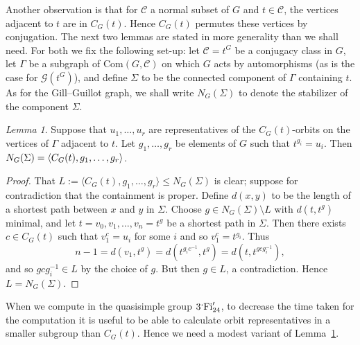 \documentclass[11pt,a4paper]{amsart}
\theoremstyle{plain}
\theoremstyle{definition}
\theoremstyle{remark}
\newtheorem{lemma}[definition]{Lemma}
\theoremstyle{remark}
\theoremstyle{remark}
\theoremstyle{definition}
\newcommand{\ns}{\mathbin{\mspace{-4mu}\vcenter{\hbox{\raisebox{1ex}{$\cdot$}}}\mspace{-4mu}}}
\newcommand{\GG}{\mathcal{G}}
\DeclareMathOperator{\Fi}{Fi}
\DeclarePairedDelimiter{\gen}{\langle}{\rangle}
\begin{document}
Another observation is that for $\mathcal C$ a normal subset of $G$ and $t\in \mathcal C$, the vertices adjacent to $t$ are in $C_G(t)$. Hence $C_G(t)$ permutes these vertices by conjugation. The next two lemmas are stated in more generality than we shall need. For both we fix the following set-up: let $\mathcal C=t^G$ be a conjugacy class in $G$, let $\Gamma$ be a subgraph of $\mathrm{Com}(G,\mathcal{C})$ on which $G$ acts by automorphisms (as is the case for $\GG(t^G)$), and define $\Sigma$ to be the connected component of $\Gamma$ containing $t$. As for the Gill--Guillot graph, we shall write $N_G(\Sigma)$ to denote the stabilizer of the component $\Sigma$.

\begin{lemma}\label{lem1} Suppose that $u_1,\dots,u_r$ are representatives of the $C_G(t)$-orbits on the vertices of $\Gamma$ adjacent to $t$. Let $g_1,\dots,g_r$ be elements of $G$ such that $t^{g_i}=u_i$. Then $N_G(\Sigma)= \gen{C_G(t),g_1,\dots,g_r}$.
\end{lemma}
\begin{proof}
That $L:=\langle C_G(t),g_1,\dots,g_r\rangle\leq N_G(\Sigma)$ is clear; suppose for contradiction that the containment is proper. Define $d(x,y)$ to be the length of a shortest path between $x$ and $y$ in $\Sigma$. Choose $g \in N_G(\Sigma)\setminus L$ with $d(t,t^g)$ minimal, and let $t=v_0,v_1,\dots, v_n=t^g$ be a shortest path in $\Sigma$. Then there exists $c\in C_G(t)$ such that $v_1^c= u_i$ for some $i$ and so $v_1^{c}=t^{g_i}$. Thus
\[ n-1=d(v_1,t^g)=d(t^{g_ic^{-1}},t^g)=d(t,t^{gcg_i^{-1}}),\]
and so $gcg_i^{-1} \in L$ by the choice of $g$. But then $g\in L$, a contradiction. Hence $L =N_G(\Sigma)$.
\end{proof}

When we compute in the quasisimple group $3\ns\Fi_{24}'$, to decrease the time taken for the computation it is useful to be able to calculate orbit representatives in a smaller subgroup than $C_G(t)$. Hence we need a modest variant of Lemma~\ref{lem1}.
\end{document}
